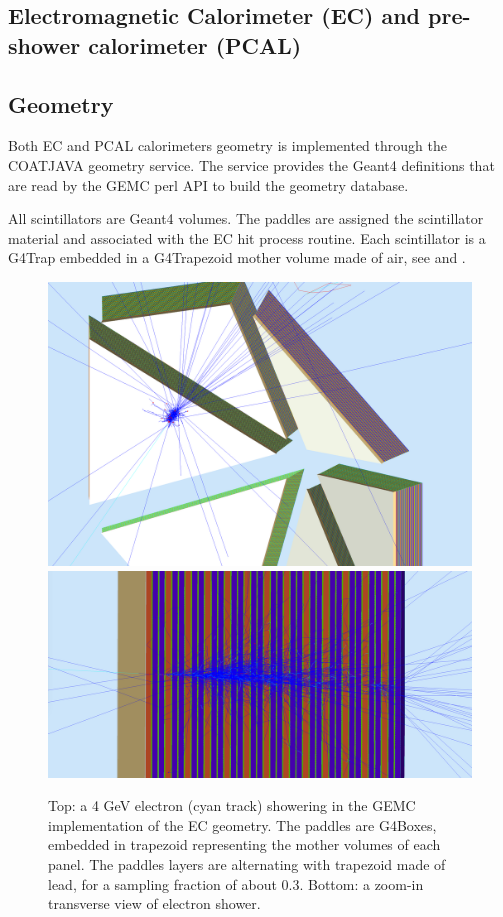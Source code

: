 \subsection{Electromagnetic Calorimeter (EC) and pre-shower calorimeter (PCAL)}

\subsection{Geometry}

Both EC and PCAL calorimeters geometry is implemented through the COATJAVA geometry service.
The service provides the Geant4 definitions that are read by the GEMC perl API to build the geometry database.

All scintillators are Geant4 volumes. The paddles are assigned the scintillator material and associated with the EC hit process routine.
Each scintillator is a G4Trap embedded in a G4Trapezoid mother volume made of air, see  and  .

\begin{figure}
	\centering
	\includegraphics[width=0.99\columnwidth,keepaspectratio]{img/ecGeometry.png}
	\includegraphics[width=0.99\columnwidth,keepaspectratio]{img/ecDetail.png}
	\caption{Top: a 4 GeV electron (cyan track) showering in the GEMC implementation of the EC geometry.
            The paddles are G4Boxes, embedded in trapezoid representing the mother volumes of each panel.
            The paddles layers are alternating with trapezoid made of lead, for a sampling fraction of about 0.3.
            Bottom: a zoom-in transverse view of electron shower.}
	\label{fig:ecGeometry}
\end{figure}

